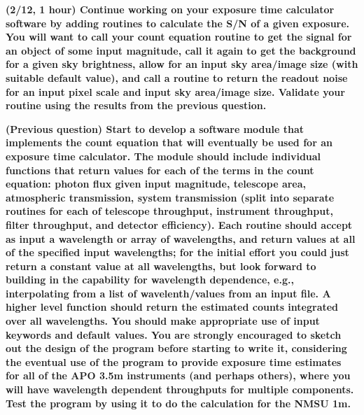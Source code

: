 \documentclass[12pt]{article}
\begin{document}
\textbf{(2/12, 1 hour) Continue working on your exposure time
calculator software by adding routines to calculate the S/N of a
given exposure. You will want to call your count equation routine
to get the signal for an object of some input magnitude, call it
again to get the background for a given sky brightness, allow for
an input sky area/image size (with suitable default value), and
call a routine to return the readout noise for an input pixel
scale and input sky area/image size. Validate your routine using
the results from the previous question.}

\textbf{(Previous question) Start to develop a software module that
implements the count equation that will eventually be used for an
exposure time calculator. The module should include individual
functions that return values for each of the terms in the count
equation: photon flux given input magnitude, telescope area,
atmospheric transmission, system transmission (split into separate
routines for each of telescope throughput, instrument throughput,
filter throughput, and detector efficiency). Each routine should
accept as input a wavelength or array of wavelengths, and return
values at all of the specified input wavelengths; for the initial
effort you could just return a constant value at all wavelengths, but
look forward to building in the capability for wavelength dependence,
e.g., interpolating from a list of wavelenth/values from an input
file. A higher level function should return the estimated counts
integrated over all wavelengths. You should make appropriate use of
input keywords and default values. You are strongly encouraged to
sketch out the design of the program before starting to write it,
considering the eventual use of the program to provide exposure time
estimates for all of the APO 3.5m instruments (and perhaps others),
where you will have wavelength dependent throughputs for multiple
components. Test the program by using it to do the calculation for the
NMSU 1m.}
\end{document}
